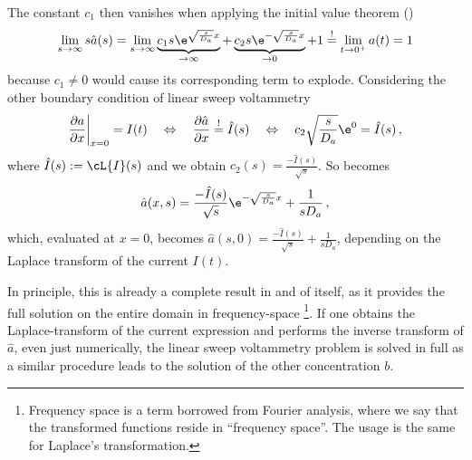 \documentclass{prettytex/ox/mmsc-special-topic}
\begin{document}
  The constant $c_1$ then vanishes when applying the initial value theorem ()
  $$\lim_{s \rightarrow \infty} s \hat{a}(s) = \lim_{s \rightarrow \infty} \underbrace{c_1 s \e^{\sqrt{\frac{s}{D_a}}x}}_{\rightarrow \infty} + \underbrace{c_2 s \e^{-\sqrt{\frac{s}{D_a}}x}}_{\rightarrow 0} + 1 \overset{!}{=} \lim_{t \rightarrow 0^+} a(t) = 1$$
  because $c_1 \neq 0$ would cause its corresponding term to explode. Considering the other boundary condition of linear sweep voltammetry
  $$\frac{\partial a}{\partial x}\bigg|_{x=0} = I(t) \quad \Leftrightarrow \quad \frac{\partial \hat{a}}{\partial x} \overset{!}{=} \hat{I}(s) \quad \Leftrightarrow \quad c_2 \sqrt{\frac{s}{D_a}} \e^{0} = \hat{I}(s)\,,$$
  where $\hat{I}(s) := \cL\{I\}(s)$ and we obtain $c_2(s) = \frac{-\hat{I}(s)}{\sqrt{s}}$.
  So  becomes
  \begin{equation}
    \hat{a}(x, s) = \frac{-\hat{I}(s)}{\sqrt{s}} \e^{-\sqrt{\frac{s}{D_a}}x} + \frac{1}{s D_a}\,,
    \label{eq:laplace-solution}
  \end{equation}
  which, evaluated at $x = 0$, becomes $\hat{a}(s, 0) = \frac{-\hat{I}(s)}{\sqrt{s}} + \frac{1}{s D_a}$, depending on the Laplace transform of the current $I(t)$.

  In principle, this is already a complete result in and of itself, as it provides the full solution on the entire domain in frequency-space \footnote{Frequency space is a term borrowed from Fourier analysis, where we say that the transformed functions reside in ``frequency space''. The usage is the same for Laplace's transformation.}. If one obtains the Laplace-transform of the current expression  and performs the inverse transform of $\hat{a}$, even just numerically, the linear sweep voltammetry problem is solved in full as a similar procedure leads to the solution of the other concentration $b$.
\end{document}
